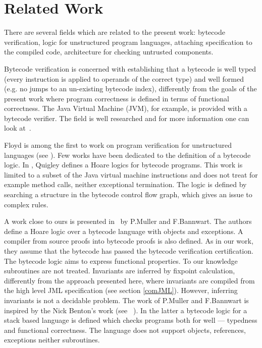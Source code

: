 \section{Related Work} \label{relWork}
    
There are several fields which are related to the present work: bytecode verification, logic for unstructured program languages, attaching specification to the compiled code, architecture for checking untrusted components.

 Bytecode verification is concerned with establishing that a bytecode is well typed 
(every instruction is applied to operands of the correct type) and well formed 
(e.g. no jumps to an un-existing bytecode index), differently from the goals of the present
work where program correctness is defined in terms of functional correctness. The Java Virtual Machine (JVM), for example, is provided with a bytecode verifier. 
The field is well researched and for more information one can look at~\cite{Ljbc}.  

Floyd is among the first to work on program verification for unstructured languages (see \cite{F67amp}).
Few works have been dedicated to the definition of a bytecode logic. In \cite{Quigley}, Quigley defines a Hoare logics for bytecode programs. 
 This work is limited to a subset of the Java virtual machine instructions and does not treat for example method calls, 
 neither exceptional termination. The logic is defined by searching a structure in the bytecode control flow graph, 
 which gives an issue to complex rules.

A work close to ours is presented in~\cite{BM05plb} by P.Muller and F.Bannwart. The authors define a Hoare logic over a 
bytecode language with objects and  exceptions. A compiler from source proofs into bytecode proofs is also defined. 
As in our work, they assume that the bytecode has passed the bytecode verification certification. The bytecode logic aims to 
express functional properties. To our knowledge subroutines are not treated. Invariants are inferred by fixpoint calculation, differently 
from the approach presented here, where invariants are compiled from the high level JML specification (see section \ref{comJML}). 
However, inferring invariants is not a decidable problem. The work of P.Muller and F.Bannwart is inspired by the Nick Benton's work (see ~\cite{B04tlsj}). 
In the latter a bytecode logic for a stack based language is defined which checks programs both for well --- typedness and functional correctness. 
 The language does not support objects, references, exceptions neither subroutines. 

